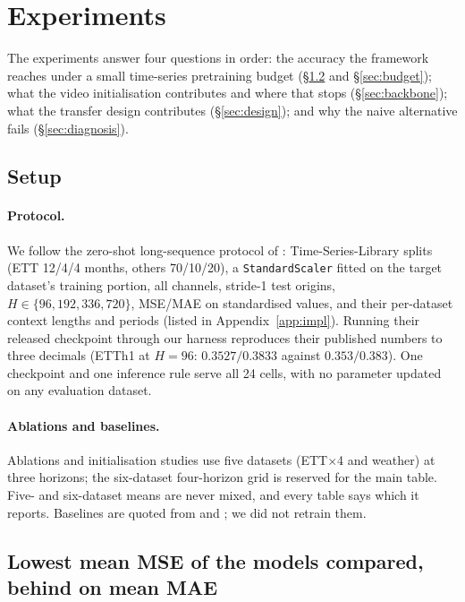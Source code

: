 \section{Experiments}
\label{sec:experiments}

The experiments answer four questions in order: the accuracy the framework reaches under a small
time-series pretraining budget (\S\ref{sec:main} and \S\ref{sec:budget}); what the video
initialisation contributes and where that stops (\S\ref{sec:backbone}); what the transfer design
contributes (\S\ref{sec:design}); and why the naive alternative fails (\S\ref{sec:diagnosis}).

\subsection{Setup}
\label{sec:setup}

\paragraph{Protocol.} We follow the zero-shot long-sequence protocol of \citet{visionts}:
Time-Series-Library splits \citep{tslib} (ETT 12/4/4 months, others 70/10/20), a
\texttt{StandardScaler} fitted on the target dataset's training portion, all channels, stride-1 test
origins, $H\in\{96,192,336,720\}$, MSE/MAE on standardised values, and their per-dataset context
lengths and periods (listed in Appendix~\ref{app:impl}). Running their released checkpoint through our harness
reproduces their published numbers to three decimals (ETTh1 at $H{=}96$: $0.3527/0.3833$ against
$0.353/0.383$). One checkpoint and one inference rule serve all 24 cells, with no parameter
updated on any evaluation dataset.

\paragraph{Ablations and baselines.} Ablations and initialisation studies use five datasets
(ETT$\times$4 and weather) at three horizons; the six-dataset four-horizon grid is reserved for the
main table. Five- and six-dataset means are never mixed, and every table says which it reports.
Baselines are quoted from \citet{visiontspp} and \citet{visionts}; we did not retrain them.

\subsection{Lowest mean MSE of the models compared, behind on mean MAE}
\label{sec:main}

